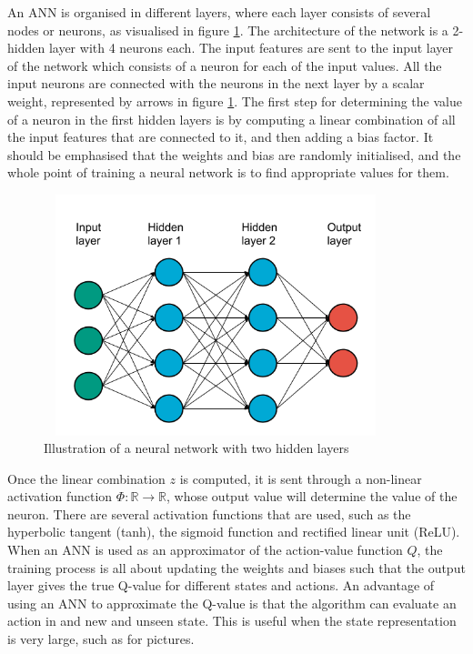 \documentclass[class=book, crop=false, 11pt]{standalone}
\begin{document}
An ANN is organised in different layers, where each layer consists of several nodes or neurons, as visualised in figure \ref{fig:theory:neural_network}. The architecture of the network is a 2-hidden layer with 4 neurons each. The input features are sent to the input layer of the network which consists of a neuron for each of the input values. All the input neurons are connected with the neurons in the next layer by a scalar weight, represented by arrows in figure \ref{fig:theory:neural_network}. The first step for determining the value of a neuron in the first hidden layers is by computing a linear combination of all the input features that are connected to it, and then adding a bias factor. It should be emphasised that the weights and bias are randomly initialised, and the whole point of training a neural network is to find appropriate values for them.
\begin{figure}[ht!]
    \center
    \includegraphics[height=7cm, width=10cm]{figures/neural_network.png}
    \caption[size = 9]{Illustration of a neural network with two hidden layers}
    \label{fig:theory:neural_network}
\end{figure}
Once the linear combination $z$ is computed, it is sent through a non-linear activation function $\Phi: \mathbb{R} \to \mathbb{R}$, whose output value will determine the value of the neuron. There are several activation functions that are used, such as the hyperbolic tangent (tanh), the sigmoid function and rectified linear unit (ReLU). When an ANN is used as an approximator of the action-value function $Q$, the training process is all about updating the weights and biases such that the output layer gives the true Q-value for different states and actions. An advantage of using an ANN to approximate the Q-value is that the algorithm can evaluate an action in and new and unseen state. This is useful when the state representation is very large, such as for pictures. 
\end{document}
